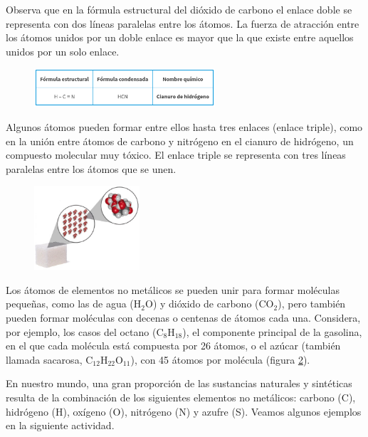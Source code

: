 \documentclass[11pt]{book}
\begin{document}
Observa que en la fórmula estructural del dióxido de carbono el enlace doble se representa con dos líneas
paralelas entre los átomos. La fuerza de atracción entre los átomos unidos por un doble enlace es mayor
que la que existe entre aquellos unidos por un solo enlace.


\begin{figure}[H]
  \centering
  \includegraphics[width=0.6\textwidth]{formulas_hcn.png}
  \label{fig:formulas_hcn}
\end{figure}


Algunos átomos pueden formar entre ellos hasta tres enlaces (enlace triple),
como en la unión entre átomos de carbono y nitrógeno en el cianuro de hidrógeno,
un compuesto molecular muy tóxico. El enlace triple se representa con tres líneas
paralelas entre los átomos que se unen.


\begin{figure}
  \centering
  \includegraphics[width=0.35\textwidth]{azucar.jpg}
  \label{fig:azucar}
\end{figure}

Los átomos de elementos no metálicos se pueden unir para formar moléculas pequeñas,
como las de agua (H$_2$O) y dióxido de carbono (CO$_2$), pero también pueden formar moléculas con
decenas o centenas de átomos cada una. Considera, por ejemplo, los casos del octano (C$_8$H$_18$),
el componente principal de la gasolina, en el que cada molécula está compuesta por 26 átomos,
o el azúcar (también llamada sacarosa, C$_{12}$H$_{22}$O$_{11}$), con 45 átomos por molécula (figura \ref{fig:azucar}).

En nuestro mundo, una gran proporción de las sustancias naturales y sintéticas resulta de la
combinación de los siguientes elementos no metálicos: carbono (C), hidrógeno (H), oxígeno (O), nitrógeno
(N) y azufre (S). Veamos algunos ejemplos en la siguiente actividad.
\end{document}

